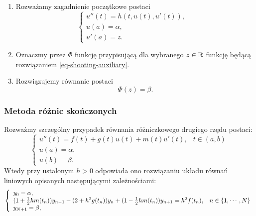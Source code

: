 \documentclass[notheorems]{beamer}
\begin{document}
\begin{frame}
\begin{algorithm}
\begin{enumerate}
\item Rozważamy zagadnienie początkowe postaci
\begin{equation} \label{eq-shooting-auxiliary}
\left\{\begin{array}{ll}
u''(t)=h(t,u(t),u'(t)), & \\
u(a)= \alpha, & \\
u'(a)= z.
\end{array}\right.
\end{equation}
\item Oznaczmy przez $\Phi$ funkcję przypisującą dla wybranego $z \in \mathbb{R}$ funkcję będącą rozwiązaniem \eqref{eq-shooting-auxiliary}.
\item Rozwiązujemy równanie postaci 
$$
\Phi(z) = \beta.
$$ 
\end{enumerate}
\end{algorithm}
\end{frame}
\begin{frame}
\begin{scriptsize}
\frametitle{Metoda różnic skończonych}
Rozważmy szczególny przypadek równania różniczkowego drugiego rzędu postaci:
\begin{equation}\label{rownanie_brzegowe}
\left\{\begin{array}{ll}
u''(t)=f(t) + g(t) u(t) + m(t) u'(t), & t \in (a,b) \\
u(a)= \alpha, & \\
u(b)= \beta.
\end{array}\right.
\end{equation}
Wtedy przy ustalonym $h>0$ odpowiada ono rozwiązaniu układu równań liniowych opisanych następującymi zależnościami: 
\begin{equation}\label{zagadnienie_liniowe}
\left\{\begin{array}{ll}
y_0 = \alpha, & \\
(1+ \frac{1}{2}h m(t_n))y_{n-1} - (2+ h^2 g(t_n))y_n + (1- \frac{1}{2}h m(t_n))y_{n+1} = h^2 f(t_n) ,& n \in \left\lbrace {1,\cdots,N} \right\rbrace \\
y_{N+1} = \beta,
\end{array}\right. 
\end{equation}
\end{scriptsize}
\end{frame}
\end{document}
